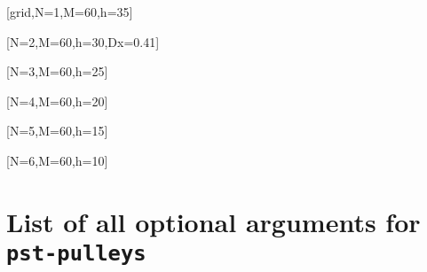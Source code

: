 \documentclass[11pt,english,BCOR10mm,DIV12,bibliography=totoc,parskip=false,
   smallheadings, headexclude,footexclude,oneside]{pst-doc}
\begin{document}
\begin{center}
\pspulleys[grid,N=1,M=60,h=35]

\vspace{1.5cm}
[grid,N=1,M=60,h=35]
\end{center}

\begin{center}
\pspulleys[N=2,M=60,h=30,Dx=0.41]

\vspace{1.5cm}
[N=2,M=60,h=30,Dx=0.41]
\end{center}

\begin{center}
\pspulleys[N=3,M=60,h=25]

\vspace{1.5cm}
[N=3,M=60,h=25]
\end{center}

\begin{center}
\pspulleys[N=4,M=60,h=20]

\vspace{1.5cm}
[N=4,M=60,h=20]
\end{center}

\begin{center}
\pspulleys[N=5,M=60,h=15]

\vspace{1.5cm}
[N=5,M=60,h=15]
\end{center}

\begin{center}
\pspulleys[N=6,M=60,h=10]

\vspace{1.5cm}
[N=6,M=60,h=10]
\end{center}


\clearpage
\section{List of all optional arguments for \texttt{pst-pulleys}}





\bgroup
\raggedright
\nocite{*}


\egroup

\printindex
\end{document}
